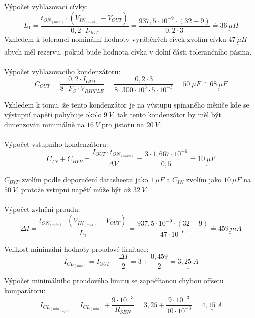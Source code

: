 Výpočet vyhlazovací cívky:
\begin{equation}
L_1 = \dfrac{t_{ON_{(min)}} \cdot \left(V_{IN_{(max)}} - V_{OUT} \right)}{0,2 \cdot I_{OUT}} = \dfrac{937,5 \cdot 10^{-9} \cdot (32 - 9)}{0,2 \cdot 3} \doteq \underline{\underline{36~\mu H}}
\nonumber
\end{equation}
Vzhledem k toleranci nominální hodnoty vyráběných cívek zvolím cívku $\underline{\underline{47~\mu H}}$ abych měl rezervu, pokud bude hodnota cívka v dolní části tolerančního pásma.
\\\\\indent
Výpočet vyhlazovacího kondenzátoru:
\begin{equation}
C_{OUT} = \dfrac{0,2 \cdot I_{OUT}}{8 \cdot F_S \cdot V_{RIPPLE}} = \dfrac{0,2 \cdot 3}{8 \cdot 300 \cdot 10^{3} \cdot 5 \cdot 10^{-3}} = 50~\mu F \doteq \underline{\underline{68~\mu F}}
\nonumber
\end{equation}

Vzhledem k tomu, že tento kondenzátor je na výstupu spínaného měniče kde se výstupní napětí pohybuje okolo $9~V$, tak tento kondenzátor by měl být dimenzován minimálně na $16~V$ pro jistotu na $20~V$.
\\\\\indent
Výpočet vstupního kondenzátoru:
\begin{equation}
C_{IN} + C_{BYP} = \dfrac{I_{OUT} \cdot t_{ON_{(max)}}}{\Delta V} = \dfrac{3 \cdot 1,667 \cdot 10^{-6}}{0,5} \doteq \underline{\underline{10~\mu F}}
\nonumber
\end{equation}

$C_{BYP}$ zvolím podle doporučení datasheetu jako $1~\mu F$ a $C_{IN}$ zvolím jako $10~\mu F$ na $50~V$, protože vstupní napětí může být až $32~V$.
\\\\\indent
Výpočet zvlnění proudu:
\begin{equation}
\Delta I = \dfrac{t_{ON_{(min)}} \cdot \left(V_{IN_{(max)}} - V_{OUT} \right)}{L_1} = \dfrac{937,5 \cdot 10^{-9} \cdot (32 - 9)}{47 \cdot 10^{-6}} \doteq \underline{\underline{459~mA}}
\nonumber
\end{equation}

Velikost minimální hodnoty proudové limitace:
\begin{equation}
I_{CL_{(min)}} = I_{OUT} + \dfrac{\Delta I}{2} = 3 + \dfrac{0,459}{2} \doteq \underline{\underline{3,25~A}}
\nonumber
\end{equation}

Výpočet minimálního proudového limitu se započítanou chybou offsetu komparátoru:
\begin{equation}
I_{CL_{(min)_{offset}}} = I_{CL_{(min)}} + \dfrac{9 \cdot 10^{-3}}{R_{SEN}} = 3,25 + \dfrac{9 \cdot 10^{-3}}{10 \cdot 10^{-3}} = \underline{\underline{4,15~A}}
\nonumber
\end{equation}

